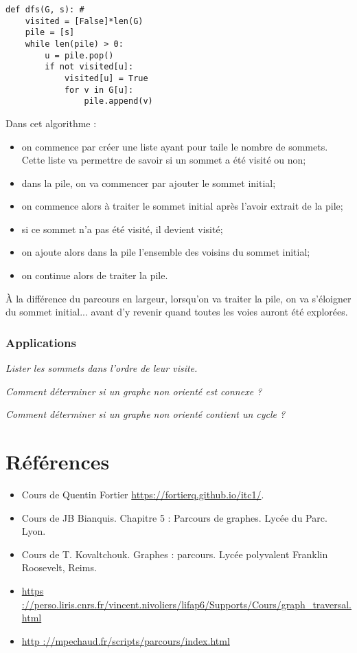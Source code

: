 \begin{lstlisting}
def dfs(G, s): #
    visited = [False]*len(G)
    pile = [s]
    while len(pile) > 0:
        u = pile.pop()
        if not visited[u]:
            visited[u] = True
            for v in G[u]:
                pile.append(v)
\end{lstlisting}

Dans cet algorithme : 
\begin{itemize}
\item on commence par créer une liste ayant pour taile le nombre de sommets. Cette liste va permettre de savoir si un sommet a été visité ou non;
\item dans la pile, on va commencer par ajouter le sommet initial;
\item on commence alors à traiter le sommet initial après l'avoir extrait de la pile;
\item si ce sommet n'a pas été visité, il devient visité;
\item on ajoute alors dans la pile l'ensemble des voisins du sommet initial;
\item on continue alors de traiter la pile. 
\end{itemize}
À la différence du parcours en largeur, lorsqu'on va traiter la pile, on va s'éloigner du sommet initial... avant d'y revenir quand toutes les voies auront été explorées. 

\subsubsection{Applications}
\begin{exemple}
\textit{Lister les sommets dans l'ordre de leur visite.}
\end{exemple}


\begin{exemple}
\textit{Comment déterminer si un graphe non orienté est connexe ?}
\end{exemple}


\begin{exemple}
\textit{Comment déterminer si un graphe non orienté contient un cycle ?}
\end{exemple}

\section*{Références}

\begin{itemize}
\item Cours de Quentin Fortier \url{https://fortierq.github.io/itc1/}.
\item Cours de JB Bianquis. Chapitre 5 : Parcours de graphes. Lycée du Parc. Lyon.
\item Cours de T. Kovaltchouk. Graphes : parcours. Lycée polyvalent Franklin Roosevelt, Reims.
\item \url{https ://perso.liris.cnrs.fr/vincent.nivoliers/lifap6/Supports/Cours/graph_traversal.html}
\item \url{http ://mpechaud.fr/scripts/parcours/index.html}
\end{itemize}